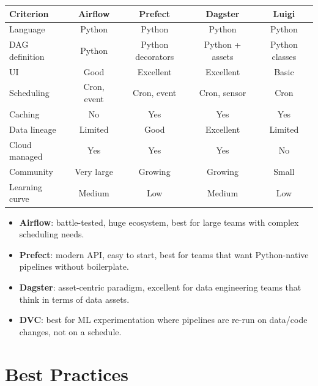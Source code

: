 \begin{center}
\begin{tabular}{@{}lcccc@{}}
\toprule
\textbf{Criterion} & \textbf{Airflow} & \textbf{Prefect} & \textbf{Dagster} & \textbf{Luigi} \\
\midrule
Language       & Python  & Python  & Python  & Python \\
DAG definition & Python  & Python decorators & Python + assets & Python classes \\
UI             & Good    & Excellent & Excellent & Basic \\
Scheduling     & Cron, event & Cron, event & Cron, sensor & Cron \\
Caching        & No      & Yes    & Yes    & Yes    \\
Data lineage   & Limited & Good   & Excellent & Limited \\
Cloud managed  & Yes     & Yes    & Yes    & No     \\
Community      & Very large & Growing & Growing & Small \\
Learning curve & Medium  & Low    & Medium & Low    \\
\bottomrule
\end{tabular}
\end{center}

\begin{bestpractice}[title=\textbf{Choosing an orchestrator}]
\begin{itemize}
  \item \textbf{Airflow}: battle-tested, huge ecosystem, best for large
    teams with complex scheduling needs.
  \item \textbf{Prefect}: modern API, easy to start, best for teams that
    want Python-native pipelines without boilerplate.
  \item \textbf{Dagster}: asset-centric paradigm, excellent for data
    engineering teams that think in terms of data assets.
  \item \textbf{DVC}: best for ML experimentation where pipelines are
    re-run on data/code changes, not on a schedule.
\end{itemize}
\end{bestpractice}

\section{Best Practices}

